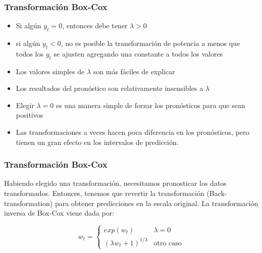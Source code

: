 \documentclass[10pt]{beamer}
\begin{document}






\begin{frame}[fragile]
\frametitle{Transformación Box-Cox}

\begin{itemize}
\item Si algún $y_t = 0$, entonces debe tener $\lambda > 0$
\item si algún $y_t < 0$, no es posible la transformación de potencia a menos que todos los $y_t$ se ajusten agregando una constante a todos los valores
\item Los valores simples de $\lambda$ son más fáciles de explicar
\item Los resultados del pronóstico son relativamente insensibles a $\lambda$
\item Elegir $ \lambda = 0$ es una manera simple de forzar los pronósticos para que sean positivos
\item Las transformaciones a veces hacen poca diferencia en los pronósticos, pero tienen un gran efecto en los intervalos de predicción.
\end{itemize}



\end{frame}






\begin{frame}
\frametitle{Transformación Box-Cox}

Habiendo elegido una transformación, necesitamos pronosticar los datos transformados. Entonces, tenemos que revertir la transformación (Back-transformation) para obtener predicciones en la escala original. La transformación inversa de Box-Cox viene dada por:

\vspace{4mm}

\begin{equation}
w_t = 
   \begin{cases} 
      exp(w_t)              & \lambda = 0   \\
      (\lambda w_t +1)^{1/\lambda}   & \mbox{otro caso}
   \end{cases}
\end{equation}


\end{frame}
\end{document}
